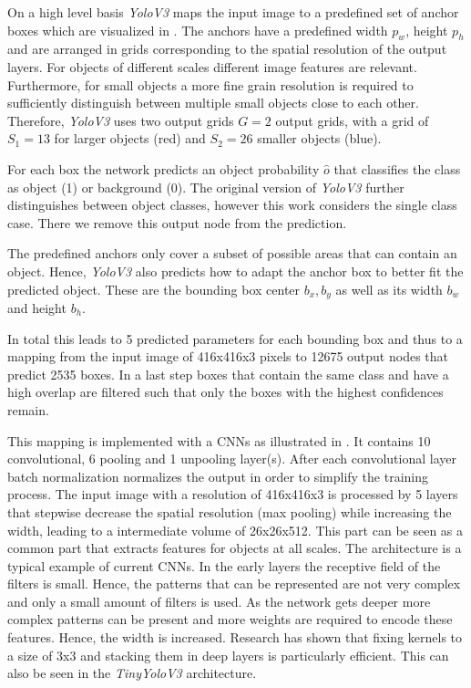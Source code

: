 	On a high level basis \textit{YoloV3} maps the input image to a predefined set of anchor boxes which are visualized in . The anchors have a predefined width $p_w$, height $p_h$ and are arranged in grids corresponding to the spatial resolution of the output layers. For objects of different scales different image features are relevant. Furthermore, for small objects a more fine grain resolution is required to sufficiently distinguish between multiple small objects close to each other. Therefore, \textit{YoloV3} uses two output grids $G=2$ output grids, with a grid of $S_1 =13$ for larger objects (red) and $S_2 = 26$ smaller objects (blue). 
	
	For each box the network predicts an object probability $\hat o$ that classifies the class as object (1) or background (0). The original version of \textit{YoloV3} further distinguishes between object classes, however this work considers the single class case. There we remove this output node from the prediction. 
	
	The predefined anchors only cover a subset of possible areas that can contain an object. Hence, \textit{YoloV3} also predicts how to adapt the anchor box to better fit the predicted object. These are  the bounding box center $b_x,b_y$ as well as its width $b_w$ and height $b_h$. 
		
	In total this leads to 5 predicted parameters for each bounding box and thus to a mapping from the input image of 416x416x3 pixels to 12675 output nodes that predict 2535 boxes. In a last step boxes that contain the same class and have a high overlap are filtered such that only the boxes with the highest confidences remain.	
			
	This mapping is implemented with a \acp{CNN} as illustrated in  . It contains 10 convolutional, 6 pooling and 1 unpooling layer(s). After each convolutional layer batch normalization normalizes the output in order to simplify the training process.
	The input image with a resolution of 416x416x3 is processed by 5 layers that stepwise decrease the spatial resolution (max pooling) while increasing the width, leading to a intermediate volume of 26x26x512. This part can be seen as a common part that extracts features for objects at all scales. The architecture is a typical example of current \acp{CNN}. In the early layers the receptive field of the filters is small. Hence, the patterns that can be represented are not very complex and only a small amount of filters is used. As the network gets deeper more complex patterns can be present and more weights are required to encode these features. Hence, the width is increased. Research has shown that fixing kernels to a size of 3x3 and stacking them in deep layers is particularly efficient. This can also be seen in the \textit{TinyYoloV3} architecture. 
	

